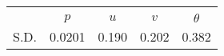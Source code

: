 \begin{tabular}{l*{1}{cccc}}
\toprule
                &\multicolumn{4}{c}{}                   \\
                &$  p$&$ u $&$ v $&$ \theta $\\
\midrule
S.D.              &   0.0201&    0.190&    0.202&    0.382\\
\bottomrule
\end{tabular}
